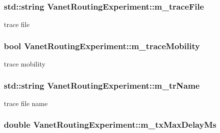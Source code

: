 \subsubsection[{\texorpdfstring{m\+\_\+trace\+File}{m_traceFile}}]{\setlength{\rightskip}{0pt plus 5cm}std\+::string Vanet\+Routing\+Experiment\+::m\+\_\+trace\+File\hspace{0.3cm}{\ttfamily [private]}}\hypertarget{classVanetRoutingExperiment_a71d4ca6c5a1d376e7313ffa30418622e}{}\label{classVanetRoutingExperiment_a71d4ca6c5a1d376e7313ffa30418622e}


trace file 

\subsubsection[{\texorpdfstring{m\+\_\+trace\+Mobility}{m_traceMobility}}]{\setlength{\rightskip}{0pt plus 5cm}bool Vanet\+Routing\+Experiment\+::m\+\_\+trace\+Mobility\hspace{0.3cm}{\ttfamily [private]}}\hypertarget{classVanetRoutingExperiment_ad3900da2445a45ec098234888422075f}{}\label{classVanetRoutingExperiment_ad3900da2445a45ec098234888422075f}


trace mobility 

\subsubsection[{\texorpdfstring{m\+\_\+tr\+Name}{m_trName}}]{\setlength{\rightskip}{0pt plus 5cm}std\+::string Vanet\+Routing\+Experiment\+::m\+\_\+tr\+Name\hspace{0.3cm}{\ttfamily [private]}}\hypertarget{classVanetRoutingExperiment_a0466c1a95224670184e95070078f593a}{}\label{classVanetRoutingExperiment_a0466c1a95224670184e95070078f593a}


trace file name 

\subsubsection[{\texorpdfstring{m\+\_\+tx\+Max\+Delay\+Ms}{m_txMaxDelayMs}}]{\setlength{\rightskip}{0pt plus 5cm}double Vanet\+Routing\+Experiment\+::m\+\_\+tx\+Max\+Delay\+Ms\hspace{0.3cm}{\ttfamily [private]}}\hypertarget{classVanetRoutingExperiment_a9190dcd0fea18c790a67ee058416c8dd}{}\label{classVanetRoutingExperiment_a9190dcd0fea18c790a67ee058416c8dd}


